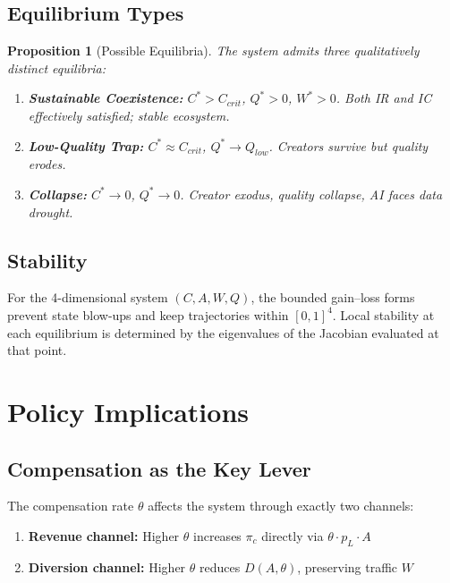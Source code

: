 \documentclass[11pt,a4paper]{article}
\newtheorem{proposition}{Proposition}
\begin{document}
\subsection{Equilibrium Types}

\begin{proposition}[Possible Equilibria]
The system admits three qualitatively distinct equilibria:
\begin{enumerate}
    \item \textbf{Sustainable Coexistence:} $C^* > C_{crit}$, $Q^* > 0$, $W^* > 0$. Both IR and IC effectively satisfied; stable ecosystem.
    \item \textbf{Low-Quality Trap:} $C^* \approx C_{crit}$, $Q^* \rightarrow Q_{low}$. Creators survive but quality erodes.
    \item \textbf{Collapse:} $C^* \rightarrow 0$, $Q^* \rightarrow 0$. Creator exodus, quality collapse, AI faces data drought.
\end{enumerate}
\end{proposition}

\subsection{Stability}

For the 4-dimensional system $(C, A, W, Q)$, the bounded gain--loss forms prevent state blow-ups and keep trajectories within $[0,1]^4$. Local stability at each equilibrium is determined by the eigenvalues of the Jacobian evaluated at that point.

\section{Policy Implications}

\subsection{Compensation as the Key Lever}

The compensation rate $\theta$ affects the system through exactly two channels:
\begin{enumerate}
    \item \textbf{Revenue channel:} Higher $\theta$ increases $\pi_c$ directly via $\theta \cdot p_L \cdot A$
    \item \textbf{Diversion channel:} Higher $\theta$ reduces $D(A, \theta)$, preserving traffic $W$
\end{enumerate}
\end{document}
